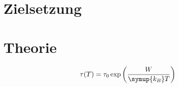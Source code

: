 \section{Zielsetzung}
\label{sec:Zielsetzung}

\section{Theorie}
\label{sec:Theorie}
\begin{equation}
    \label{eqn:Relaxzeit}
    \tau(T) = \tau_0 \exp\left(\frac{W}{\symup{k_B} T}\right)
\end{equation}



\FloatBarrier
